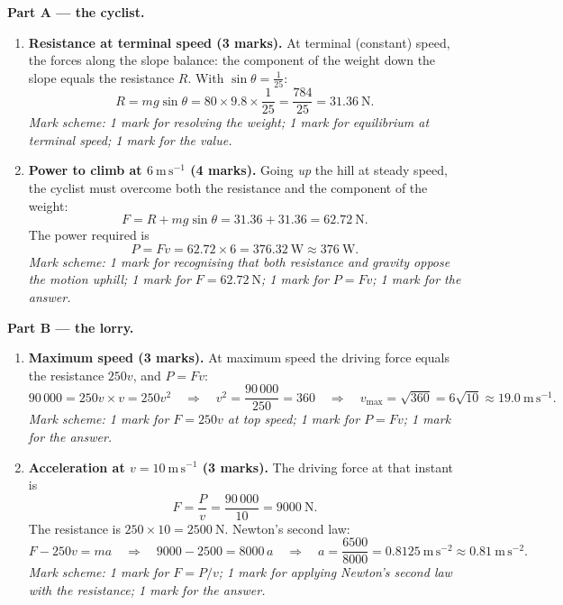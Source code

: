 \documentclass[11pt]{article}
\begin{document}
\begin{corrige}
\textbf{Part A — the cyclist.}
\begin{enumerate}
\item \textbf{Resistance at terminal speed (3 marks).} At terminal (constant) speed, the forces along the slope balance: the component of the weight down the slope equals the resistance $R$. With $\sin\theta = \tfrac{1}{25}$:
\[
R = mg\sin\theta = 80\times 9.8\times \frac{1}{25} = \frac{784}{25} = 31.36\ \mathrm{N}.
\]
\textit{Mark scheme: 1 mark for resolving the weight; 1 mark for equilibrium at terminal speed; 1 mark for the value.}

\item \textbf{Power to climb at $6\ \mathrm{m\,s^{-1}}$ (4 marks).} Going \emph{up} the hill at steady speed, the cyclist must overcome both the resistance and the component of the weight:
\[
F = R + mg\sin\theta = 31.36 + 31.36 = 62.72\ \mathrm{N}.
\]
The power required is
\[
P = Fv = 62.72\times 6 = 376.32\ \mathrm{W} \approx 376\ \mathrm{W}.
\]
\textit{Mark scheme: 1 mark for recognising that both resistance and gravity oppose the motion uphill; 1 mark for $F = 62.72\ \mathrm{N}$; 1 mark for $P = Fv$; 1 mark for the answer.}
\end{enumerate}

\textbf{Part B — the lorry.}
\begin{enumerate}
\item[(a)] \textbf{Maximum speed (3 marks).} At maximum speed the driving force equals the resistance $250v$, and $P = Fv$:
\[
90\,000 = 250v \times v = 250v^{2}
\quad\Longrightarrow\quad
v^{2} = \frac{90\,000}{250} = 360
\quad\Longrightarrow\quad
v_{\max} = \sqrt{360} = 6\sqrt{10}\approx 19.0\ \mathrm{m\,s^{-1}}.
\]
\textit{Mark scheme: 1 mark for $F = 250v$ at top speed; 1 mark for $P = Fv$; 1 mark for the answer.}

\item[(b)] \textbf{Acceleration at $v = 10\ \mathrm{m\,s^{-1}}$ (3 marks).} The driving force at that instant is
\[
F = \frac{P}{v} = \frac{90\,000}{10} = 9000\ \mathrm{N}.
\]
The resistance is $250\times 10 = 2500\ \mathrm{N}$. Newton's second law:
\[
F - 250v = ma
\quad\Longrightarrow\quad
9000 - 2500 = 8000\,a
\quad\Longrightarrow\quad
a = \frac{6500}{8000} = 0.8125\ \mathrm{m\,s^{-2}} \approx 0.81\ \mathrm{m\,s^{-2}}.
\]
\textit{Mark scheme: 1 mark for $F = P/v$; 1 mark for applying Newton's second law with the resistance; 1 mark for the answer.}
\end{enumerate}


\end{corrige}
\end{document}
